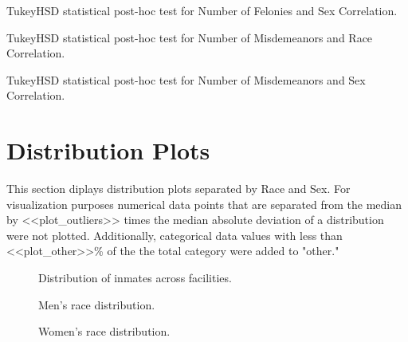 \documentclass{article}
\begin{document}
\begin{table}[H]
\centering
\noindent\makebox[\textwidth]{%
}
\caption{TukeyHSD statistical post-hoc test for Number of Felonies and Sex Correlation.}
\label{Tab:thsd_NoFS}
\end{table}

\begin{table}[H]
\centering
\noindent\makebox[\textwidth]{%
}
\caption{TukeyHSD statistical post-hoc test for Number of Misdemeanors and Race Correlation.}
\label{Tab:thsd_NoMR}
\end{table}

\begin{table}[H]
\centering
\noindent\makebox[\textwidth]{%
}
\caption{TukeyHSD statistical post-hoc test for Number of Misdemeanors and Sex Correlation.}
\label{Tab:thsd_NoMS}
\end{table}
    
    
\section{Distribution Plots}
This section diplays distribution plots separated by Race and Sex. For visualization purposes numerical data points that are separated from the median by <<plot\_outliers>> times the median absolute deviation of a distribution were not plotted. Additionally, categorical data values with less than <<plot\_other>>\% of the the total category were added to "other."

\begin{figure}[H]
\centering
\noindent{}
\caption{Distribution of inmates across facilities.}
\label{fig:Facilities}
\end{figure}

\begin{figure}[H]
\centering
\noindent{}
\caption{Men's race distribution.}
\label{fig:TRace_distr}
\end{figure}


\begin{figure}[H]
\centering
\noindent{}
\caption{Women's race distribution.}
\label{figMRace_distr:}
\end{figure}
\end{document}
